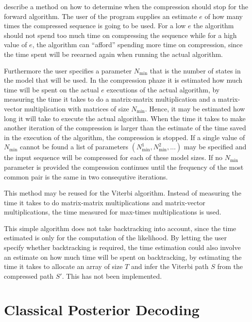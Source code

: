 \citet{sand2013ziphmmlib} describe a method on how to determine when the
compression should stop for the forward algorithm. The user of the program
supplies an estimate $e$ of how many times the compressed sequence is going to
be used. For a low $e$ the algorithm should not spend too much time on
compressing the sequence while for a high value of $e$, the algorithm can
``afford'' spending more time on compression, since the time spent will be
reearned again when running the actual algorithm.

Furthermore the user specifies a parameter $N_{\text{min}}$ that is the number
of states in the model that will be used. In the compression phaze it is
estimated how much time will be spent on the actual $e$ executions of the
actual algorithm, by measuring the time it takes to do a matrix-matrix
multiplication and a matrix-vector multiplication with matrices of size
$N_{\text{min}}$. Hence, it may be estimated how long it will take to execute
the actual algorithm. When the time it takes to make another iteration of the
compression is larger than the estimate of the time saved in the execution of
the algorithm, the compression is stopped. If a single value of
$N_{\text{min}}$ cannot be found a list of parameters
$(N_{\text{min}}^1, N_{\text{min}}^2, \dots)$ may be specified and the input
sequence will be compressed for each of these model sizes. If no
$N_{\text{min}}$ parameter is provided the compression continues until the
frequency of the most common pair is the same in two consequtive iterations.

This method may be reused for the Viterbi algorithm. Instead of measuring the
time it takes to do matrix-matrix multiplications and matrix-vector
multiplications, the time measured for max-times multiplications is used.

This simple algorithm does not take backtracking into account, since the time
estimated is only for the computation of the likelihood. By letting the user
specify whether backtracking is required, the time estimation could also
involve an estimate on how much time will be spent on backtracking, by
estimating the time it takes to allocate an array of size $T$ and
infer the Viterbi path $S$ from the compressed path $S'$. This has
not been implemented.

\section{Classical Posterior Decoding}
\label{sec:posterior-decoding-1}

